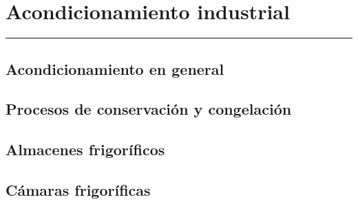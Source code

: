\chapter{Acondicionamiento industrial}

\vspace{\fill}

\hrule

\vspace{.3cm}

{\large \lipsum[1]} 

\pagestyle{fancy}

\newpage


	\section{Acondicionamiento en general}
	\Biblio{}

	\section{Procesos de conservación y congelación}
	\Biblio{}
	
	\section{Almacenes frigoríficos}
	\Biblio{}

	\section{Cámaras frigoríficas}
	\Biblio{}



\newpage
\pagestyle{empty}